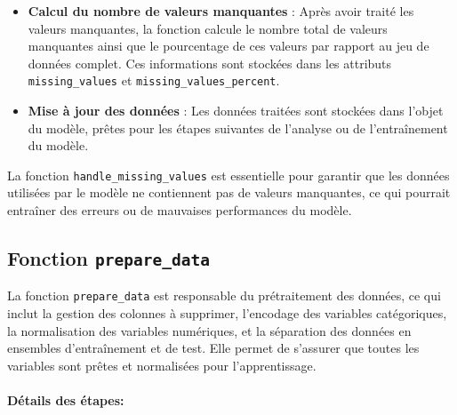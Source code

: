 \documentclass{rapport}
\begin{document}
\begin{itemize}
    \item \textbf{Calcul du nombre de valeurs manquantes} : 
    Après avoir traité les valeurs manquantes, la fonction calcule le nombre total de valeurs manquantes ainsi que le pourcentage de ces valeurs par rapport au jeu de données complet. Ces informations sont stockées dans les attributs \texttt{missing\_values} et \texttt{missing\_values\_percent}.
    
    \item \textbf{Mise à jour des données} : 
    Les données traitées sont stockées dans l'objet du modèle, prêtes pour les étapes suivantes de l'analyse ou de l'entraînement du modèle.
\end{itemize}

\noindent
La fonction \texttt{handle\_missing\_values} est essentielle pour garantir que les données utilisées par le modèle ne contiennent pas de valeurs manquantes, ce qui pourrait entraîner des erreurs ou de mauvaises performances du modèle.


\subsection{Fonction \texttt{prepare\_data}}

La fonction \texttt{prepare\_data} est responsable du prétraitement des données, ce qui inclut la gestion des colonnes à supprimer, l'encodage des variables catégoriques, la normalisation des variables numériques, et la séparation des données en ensembles d'entraînement et de test. Elle permet de s'assurer que toutes les variables sont prêtes et normalisées pour l'apprentissage.

\paragraph{Détails des étapes:}
\end{document}
